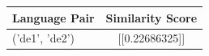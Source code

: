 \begin{tabular}{|l|c|}
\hline
Language Pair & Similarity Score \\
\hline
('de1', 'de2') & [[0.22686325]] \\
\hline
\end{tabular}

